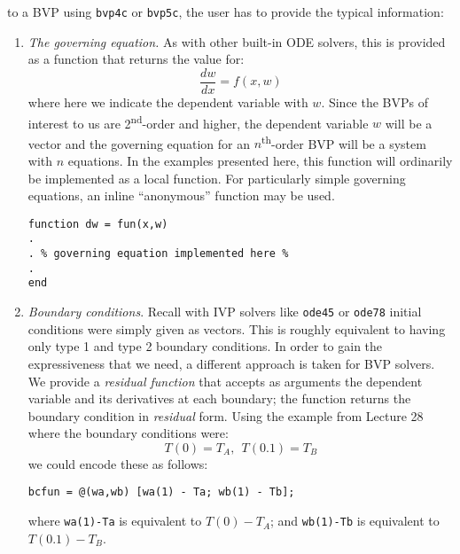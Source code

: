  to a BVP using \lstinline[style=myMatlab]{bvp4c} or \lstinline[style=myMatlab]{bvp5c}, the user has to provide the typical information:
\begin{enumerate}
\item \emph{The governing equation.} As with other built-in ODE solvers, this is provided as a function that returns the value for:
\begin{equation*}
\frac{dw}{dx} = f(x,w)
\end{equation*}
where here we indicate the dependent variable with $w$.  Since the BVPs of interest to us are 2\textsuperscript{nd}-order and higher, the dependent variable $w$ will be a vector and the governing equation for an $n$\textsuperscript{th}-order BVP will be a system with $n$ equations.  In the examples presented here, this function will ordinarily be implemented as a local function.  For particularly simple governing equations, an inline ``anonymous'' function may be used.
\begin{lstlisting}[style=myMatlab]
function dw = fun(x,w)
.
. % governing equation implemented here %
.
end
\end{lstlisting}

\item \emph{Boundary conditions}.  Recall with IVP solvers like \lstinline[style=myMatlab]{ode45} or \lstinline[style=myMatlab]{ode78} initial conditions were simply given as vectors.  This is roughly equivalent to having only type 1 and type 2 boundary conditions.  In order to gain the expressiveness that we need, a different approach is taken for BVP solvers.  We provide a \emph{residual function} that accepts as arguments the dependent variable and its derivatives at each boundary; the function returns the boundary condition in \emph{residual} form.  Using the example from Lecture 28 where the boundary conditions were:
\begin{equation*}
T(0) = T_A, \ \ T(0.1) = T_B
\end{equation*}
we could encode these as follows:
\begin{lstlisting}[style=myMatlab]
bcfun = @(wa,wb) [wa(1) - Ta; wb(1) - Tb];
\end{lstlisting}
where \lstinline[style=myMatlab]{wa(1)-Ta} is equivalent to $T(0)-T_A$; and \lstinline[style=myMatlab]{wb(1)-Tb} is equivalent to $T(0.1)-T_B$.


\end{enumerate}
